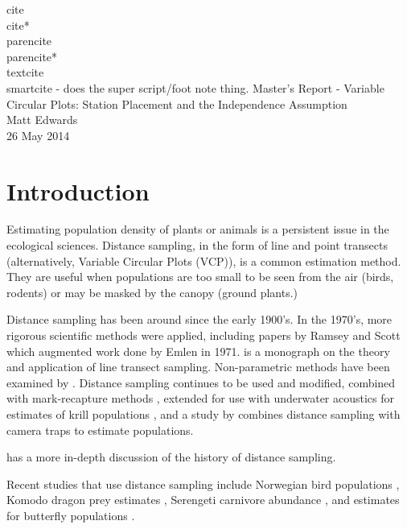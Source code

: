 \documentclass[12pt]{article}
\begin{document}
cite \cite{buckland2001} \cite{komodo2013} \\
cite* \cite*{buckland2001} \cite*{komodo2013}\\
parencite \parencite{buckland2001} \parencite{komodo2013}\\
parencite* \parencite*{buckland2001} \parencite*{komodo2013}\\
textcite \textcite{buckland2001} \textcite{komodo2013}\\
smartcite - does the super script/foot note thing.
\newpage
\begingroup  
  \centering
  \LARGE Master's Report - Variable Circular Plots: Station Placement and the Independence Assumption\\[1em]
  \large Matt Edwards\\
  26 May 2014\par
\endgroup

\section{Introduction}
Estimating population density of plants or animals is a persistent issue in the ecological sciences. Distance sampling, in the form of line and point transects (alternatively, Variable Circular Plots (VCP)), is a common estimation method. They are useful when populations are too small to be seen from the air (birds, rodents) or may be masked by the canopy (ground plants.)

Distance sampling has been around since the early 1900's. In the 1970's, more rigorous scientific methods were applied, including papers by Ramsey and Scott \parencite*{ramsey1979,ramsey1981} which augmented work done by Emlen in 1971. \cite{burnham1980} is a monograph on the theory and application of line transect sampling. Non-parametric methods have been examined by \textcite{quang1993,mack1998}. Distance sampling continues to be used and modified, combined with mark-recapture methods \parencite{laake2011}, extended for use with underwater acoustics for estimates of krill populations \parencite{krill2011}, and a study by \textcite{camera2011} combines distance sampling with camera traps to estimate populations. 

\textcite{buckland2001} has a more in-depth discussion of the history of distance sampling. 

Recent studies that use distance sampling include Norwegian bird populations \parencite{pedersen2012}, Komodo dragon prey estimates \parencite{komodo2013}, Serengeti carnivore abundance \parencite{serengeti2011}, and estimates for butterfly populations \parencite{butterfly2011}. 
\end{document}
